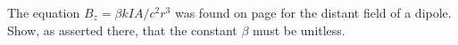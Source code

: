         The equation $B_z=\beta kIA/c^2r^3$ was found on page \pageref{dipolederivn}
        for the distant field of a dipole. Show, as asserted there, that the
        constant $\beta$ must be unitless.
